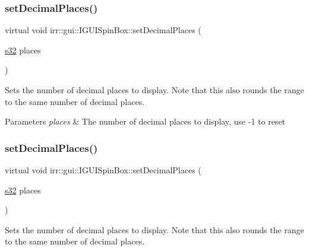 \subsubsection{\texorpdfstring{set\+Decimal\+Places()}{setDecimalPlaces()}\hspace{0.1cm}{\footnotesize\ttfamily [1/2]}}
{\footnotesize\ttfamily virtual void irr\+::gui\+::\+I\+G\+U\+I\+Spin\+Box\+::set\+Decimal\+Places (\begin{DoxyParamCaption}\item[{\hyperlink{namespaceirr_ac66849b7a6ed16e30ebede579f9b47c6}{s32}}]{places }\end{DoxyParamCaption})\hspace{0.3cm}{\ttfamily [pure virtual]}}



Sets the number of decimal places to display. Note that this also rounds the range to the same number of decimal places. 


\begin{DoxyParams}{Parameters}
{\em places} & The number of decimal places to display, use -\/1 to reset \\
\hline
\end{DoxyParams}
\mbox{\label{classirr_1_1gui_1_1IGUISpinBox_a8a335d32cbdb7f43ca814422f8cee098}} 
\subsubsection{\texorpdfstring{set\+Decimal\+Places()}{setDecimalPlaces()}\hspace{0.1cm}{\footnotesize\ttfamily [2/2]}}
{\footnotesize\ttfamily virtual void irr\+::gui\+::\+I\+G\+U\+I\+Spin\+Box\+::set\+Decimal\+Places (\begin{DoxyParamCaption}\item[{\hyperlink{namespaceirr_ac66849b7a6ed16e30ebede579f9b47c6}{s32}}]{places }\end{DoxyParamCaption})\hspace{0.3cm}{\ttfamily [pure virtual]}}



Sets the number of decimal places to display. Note that this also rounds the range to the same number of decimal places. 


